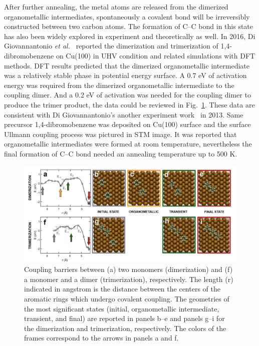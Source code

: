 \documentclass[%
 reprint,
 amsmath,amssymb,
 aps,
prb,
]{revtex4-2}
\begin{document}
After further annealing, the metal atoms are released from the dimerized organometallic intermediates, spontaneously a covalent bond will be irreversibly constructed between two carbon atoms. The formation of C--C bond in this state has also been widely explored in experiment and theoretically as well. In 2016, Di Giovannantonio \textit{et al.}~\cite{jacs2016} reported the dimerization and trimerization of 1,4-dibromobenzene on Cu(100) in UHV condition and related simulations with DFT methods. DFT results predicted that the dimerized organometallic intermediate was a relatively stable phase in potential energy surface. A 0.7 eV of activation energy was required from the dimerized organometallic intermediate to the coupling dimer. And a 0.2 eV of activation was needed for the coupling dimer to produce the trimer product, the data could be reviewed in Fig.~\ref{fig:dimer}. These data are consistent with Di Giovannantonio's another experiment work~\cite{acsnano2013} in 2013. Same precursor 1,4-dibromobenzene was deposited on Cu(100) surface and the surface Ullmann coupling process was pictured in STM image. It was reported that organometallic intermediates were formed at room temperature, nevertheless the final formation of C--C bond needed an annealing temperature up to 500 K.
%
\begin{figure}[ht]
\centering
\includegraphics[width=1.0\textwidth]{Fig/Dimer_trimer.png}
\caption{Coupling barriers between (a) two monomers (dimerization) and (f) a monomer and a dimer (trimerization), respectively. The length (r) indicated in angstrom is the distance between the centers of the aromatic rings which undergo covalent coupling. The geometries of the most significant states (initial, organometallic intermediate, transient, and final) are reported in panels b--e and panels g--i for the dimerization and trimerization, respectively. The colors of the frames correspond to the arrows in panels a and f.}
\label{fig:dimer}
\end{figure}
%
\end{document}
